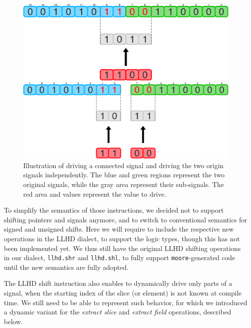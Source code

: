 \begin{figure}[ht]
    \centering
    \begin{minipage}{0.49\textwidth}
        \includegraphics[width=\textwidth]{gfx/DrvConn.png}
    \end{minipage}
    \hfill
    \begin{minipage}{0.49\textwidth}
        \includegraphics[width=\textwidth]{gfx/DrvSplit.png}
    \end{minipage}
    \caption[Illustration of driving a connected signal vs driving the two origin signals independently.]{Illustration of driving a connected signal and driving the two origin signals independently. The blue and green regions represent the two original signals, while the gray area represent their sub-signals. The red area and values represent the value to drive.}
    \label{fig:drvconn}
\end{figure}

To simplify the semantics of those instructions, we decided not to support shifting pointers and signals anymore, and to switch to conventional semantics for signed and unsigned shifts. Here we will require to include the respective new operations in the LLHD dialect, to support the logic types, though this has not been implemented yet. We thus still have the original LLHD shifting operations in our dialect, \texttt{llhd.shr} and \texttt{llhd.shl}, to fully support \texttt{moore}-generated code until the new semantics are fully adopted.

The LLHD shift instruction also enables to dynamically drive only parts of a signal, when the starting index of the slice (or element) is not known at compile time. We still need to be able to represent such behavior, for which we introduced a dynamic variant for the \textit{extract slice} and \textit{extract field} operations, described below.

